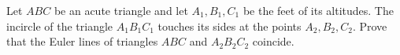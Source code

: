 Let $ABC$ be an acute triangle and let $A_{1}, B_{1}, C_{1}$ be the feet of its altitudes. The incircle of the triangle $A_{1}B_{1}C_{1}$ touches its sides at the points $A_{2}, B_{2}, C_{2}$. Prove that the Euler lines of triangles $ABC$ and $A_{2}B_{2}C_{2}$ coincide.
